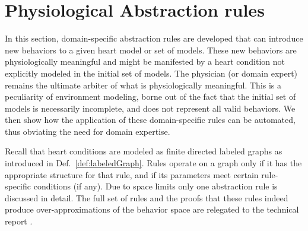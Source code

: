 \section{Physiological Abstraction rules}
\label{abstractionRules} 
In this section, domain-specific abstraction rules are developed that can introduce new behaviors to a given heart model or set of models. 
These new behaviors are physiologically meaningful and might be manifested by a heart condition not explicitly modeled in the initial set of models.
The physician (or domain expert) remains the ultimate arbiter of what is physiologically meaningful.
This is a peculiarity of environment modeling, borne out of the fact that the initial set of models is necessarily incomplete, and does not represent all valid behaviors.
We then show how the application of these domain-specific rules can be automated, thus obviating the need for domain expertise.

Recall that heart conditions are modeled as finite directed labeled graphs as introduced in Def.~\ref{def:labeledGraph}.
Rules operate on a graph only if it has the appropriate structure for that rule, and if its parameters meet certain rule-specific conditions (if any).
Due to space limits only one abstraction rule is discussed in detail. The full set of rules and the proofs that these rules indeed produce over-approximations of the behavior space are relegated to the technical report \cite{regar_tech}.
%
%


